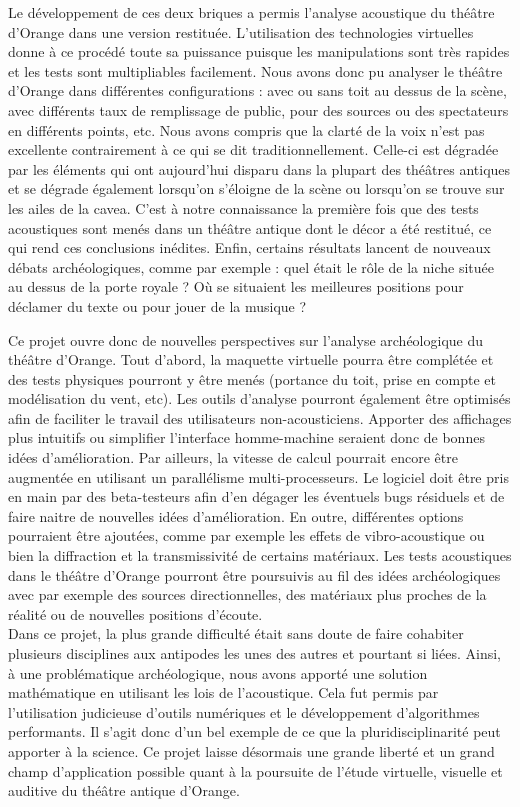 Le développement de ces deux briques a permis l'analyse acoustique du théâtre d'Or\-ange dans une version restituée. L'utilisation des technologies virtuelles donne à ce procédé toute sa puissance puisque les manipulations sont très rapides et les tests sont multipliables facilement. Nous avons donc pu analyser le théâtre d'Orange dans différentes configurations : avec ou sans toit au dessus de la scène, avec différents taux de remplissage de public, pour des sources ou des spectateurs en différents points, etc. Nous avons compris que la clarté de la voix n'est pas excellente contrairement à ce qui se dit traditionnellement. Celle-ci est dégradée par les éléments qui ont aujourd'hui disparu dans la plupart des théâtres antiques et se dégrade également lorsqu'on s'éloigne de la scène ou lorsqu'on se trouve sur les ailes de la \gls{cavea}. C'est à notre connaissance la première fois que des tests acoustiques sont menés dans un théâtre antique dont le décor a été restitué, ce qui rend ces conclusions inédites. Enfin, certains résultats lancent de nouveaux débats archéologiques, comme par exemple : quel était le rôle de la niche située au dessus de la porte royale ? Où se situaient les meilleures positions pour déclamer du texte ou pour jouer de la musique ?

Ce projet ouvre donc de nouvelles perspectives sur l'analyse archéologique du théâtre d'Orange. Tout d'abord, la maquette virtuelle pourra être complétée et des tests physiques pourront y être menés (portance du toit, prise en compte et modélisation du vent, etc). Les outils d'analyse pourront également être optimisés afin de faciliter le travail des utilisateurs non-acousticiens. Apporter des affichages plus intuitifs \cite[]{immersive} ou simplifier l'interface homme-machine seraient donc de bonnes idées d'amélioration. Par ailleurs, la vitesse de calcul pourrait encore être augmentée en utilisant un parallélisme multi-processeurs. Le logiciel doit être pris en main par des beta-testeurs afin d'en dégager les éventuels bugs résiduels et de faire naitre de nouvelles idées d'amélioration. En outre, différentes options pourraient être ajoutées, comme par exemple les effets de vibro-acoustique ou bien la diffraction et la transmissivité de certains matériaux. Les tests acoustiques dans le théâtre d'Orange pourront être poursuivis au fil des idées archéologiques avec par exemple des sources directionnelles, des matériaux plus proches de la réalité ou de nouvelles positions d'écoute. \\

Dans ce projet, la plus grande difficulté était sans doute de faire cohabiter plusieurs disciplines aux antipodes les unes des autres et pourtant si liées. Ainsi, à une problématique archéologique, nous avons apporté une solution mathématique en utilisant les lois de l'acoustique. Cela fut permis par l'utilisation judicieuse d'outils numériques et le développement d'algorithmes performants. Il s'agit donc d'un bel exemple de ce que la pluridisciplinarité peut apporter à la science. Ce projet laisse désormais une grande liberté et un grand champ d'application possible quant à la poursuite de l'étude virtuelle, visuelle et auditive du théâtre antique d'Orange.

 
 
